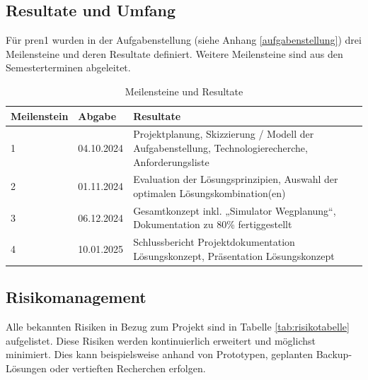 \documentclass[../main.tex]{subfiles}
\begin{document}
\subsection{Resultate und Umfang}
Für \acrshort{pren1} wurden in der Aufgabenstellung (siehe Anhang \ref{aufgabenstellung}) drei Meilensteine und deren Resultate definiert. Weitere Meilensteine sind aus den Semesterterminen abgeleitet.
\begin{table}[H]
\centering
\begin{tabular}{|l|l|p{10cm}|}
\hline
\textbf{Meilenstein} & \textbf{Abgabe} & \textbf{Resultate} \\ \hline
 1        & 04.10.2024      & Projektplanung, Skizzierung / Modell der Aufgabenstellung, Technologierecherche, Anforderungsliste \\ \hline
 2        & 01.11.2024      & Evaluation der Lösungsprinzipien, Auswahl der optimalen Lösungskombination(en) \\ \hline
 3        & 06.12.2024      & Gesamtkonzept inkl. „Simulator Wegplanung“, Dokumentation zu 80\% fertiggestellt \\ \hline
 4        & 10.01.2025      &  Schlussbericht Projektdokumentation Lösungskonzept, Präsentation Lösungskonzept\\ \hline 
 
\end{tabular}
\caption{Meilensteine und Resultate}
\label{tab:meilensteine}
\end{table}


\subsection{Risikomanagement} \label{risikomatrix}

Alle bekannten Risiken in Bezug zum Projekt sind in Tabelle \ref{tab:risikotabelle} aufgelistet. Diese Risiken werden kontinuierlich erweitert und möglichst minimiert. Dies kann beispielsweise anhand von Prototypen, geplanten Backup-Lösungen oder vertieften Recherchen erfolgen.
\end{document}
